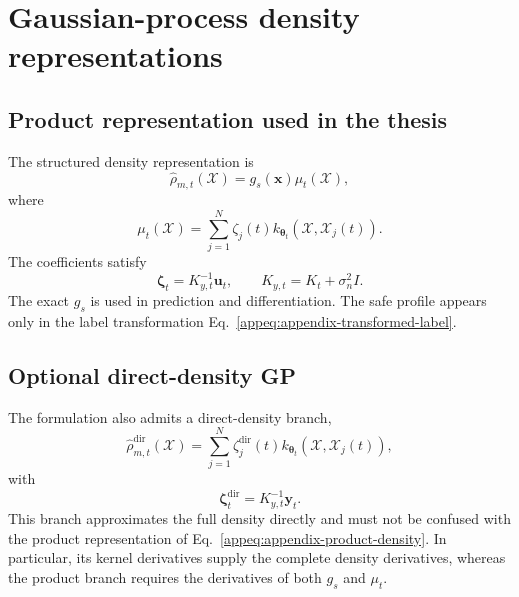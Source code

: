 \documentclass[
  11pt,
  letterpaper,
  onehalfspacing,
  normalmargins,
  equalmargins,
  oneside
]{ut-thesis}
\begin{document}
\section{Gaussian-process density representations}
\label{appsec:gp-representations}

\subsection{Product representation used in the thesis}
\label{appsubsec:product-representation}

The structured density representation is
\begin{equation}
\widehat{\rho}_{m,t}
(\boldsymbol{\mathcal X})
=
g_s(\mathbf x)
\mu_t(\boldsymbol{\mathcal X}),
\label{appeq:appendix-product-density}
\end{equation}
where
\begin{equation}
\mu_t(\boldsymbol{\mathcal X})
=
\sum_{j=1}^{N}
\zeta_j(t)
k_{\boldsymbol\theta_t}
\left(
\boldsymbol{\mathcal X},
\boldsymbol{\mathcal X}_j(t)
\right).
\label{appeq:appendix-modulation-expansion}
\end{equation}
The coefficients satisfy
\begin{equation}
\boldsymbol\zeta_t
=
K_{y,t}^{-1}\mathbf u_t,
\qquad
K_{y,t}=K_t+\sigma_n^2I.
\label{appeq:appendix-coefficient-solve}
\end{equation}
The exact \(g_s\) is used in prediction and differentiation.  The safe profile
appears only in the label transformation
Eq.~\eqref{appeq:appendix-transformed-label}.

\subsection{Optional direct-density GP}
\label{appsubsec:direct-density-gp}

The formulation also admits a direct-density branch,
\begin{equation}
\widehat{\rho}_{m,t}^{\mathrm{dir}}
(\boldsymbol{\mathcal X})
=
\sum_{j=1}^{N}
\zeta_j^{\mathrm{dir}}(t)
k_{\boldsymbol\theta_t}
\left(
\boldsymbol{\mathcal X},
\boldsymbol{\mathcal X}_j(t)
\right),
\label{appeq:direct-density-gp}
\end{equation}
with
\[
\boldsymbol\zeta_t^{\mathrm{dir}}
=
K_{y,t}^{-1}\mathbf y_t.
\]
This branch approximates the full density directly and must not be confused
with the product representation of
Eq.~\eqref{appeq:appendix-product-density}.  In particular, its kernel
derivatives supply the complete density derivatives, whereas the product
branch requires the derivatives of both \(g_s\) and \(\mu_t\).
\end{document}

